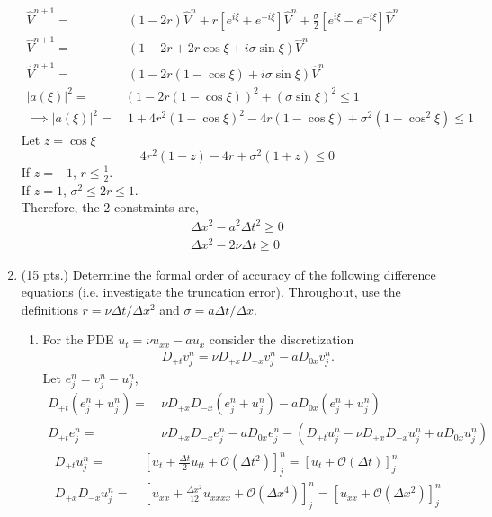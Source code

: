 \documentclass[11pt]{article}
\newcommand{\Dpt}{D_{+t}}
\newcommand{\Dpx}{D_{+x}}
\newcommand{\Dmx}{D_{-x}}
\newcommand{\Dzx}{D_{0x}}
\newcommand{\Oc}{\mathcal{O}}
\newcommand{\dx}{\Delta x}
\newcommand{\dt}{\Delta t}
\newcommand{\vnj}{v^{n}_j}
\newcommand{\texp}[3]{\left[#1\right]^{#2}_{#3}}
\newcommand{\uxx}{u_{xx}}
\newcommand{\uxxxx}{u_{xxxx}}
\newcommand{\ut}{u_t}
\newcommand{\enj}{e^{n}_{j}}
\newcommand{\unj}{u^{n}_{j}}
\newcommand{\modu}[1]{\left | {#1} \right |}
\begin{document}
\begin{enumerate}
\begin{align*}
    \hat{V}^{n+1} = & \ \left(1-2r\right)\hat{V}^n + r\left[e^{i\xi} + e^{-i\xi}\right]\hat{V}^n + \frac{\sigma}{2}\left[e^{i\xi} - e^{-i\xi}\right]\hat{V}^n \\
    \hat{V}^{n+1} = & \ \left(1 - 2r + 2r\cos\xi + i\sigma\sin\xi\right)\hat{V}^n \\
    \hat{V}^{n+1} = & \ \left(1-2r\left(1-\cos\xi\right) + i\sigma\sin\xi\right)\hat{V}^n \\
    \modu{a(\xi)}^2 = & \left(1-2r\left(1-\cos\xi\right)\right)^2 + \left(\sigma\sin\xi\right)^2 \leq 1 \\
    \implies \modu{a(\xi)}^2 = &\ 1 + 4r^2\left(1-\cos\xi\right)^2 -4r\left(1-\cos\xi\right) + \sigma^2\left(1-\cos^2\xi\right) \leq 1 
    \end{align*}
    Let $z = \cos\xi$ 
\[
4r^2\left(1-z\right) -4r + \sigma^2\left(1+z\right) \leq 0
\]
If $z=-1$, $r\leq \frac{1}{2}$. \\
If $z = 1$, $\sigma^2 \leq 2r \leq 1$.\\
Therefore, the 2 constraints are,
\begin{align}
\dx^2 - a^2\dt^2 \geq 0 \\
\dx^2 -2\nu\dt \geq 0
\end{align}
  \item (15 pts.) {\color{red}Determine the formal order of accuracy of the following difference equations (i.e. investigate the truncation error). Throughout, use the definitions }$r=\nu\dt/\dx^2$ {\color{red}and} $\sigma=a\dt/\dx$.
    \begin{enumerate}
      \item {\color{blue}For the PDE }$u_t= \nu u_{xx}-au_x$ {\color{blue}consider the discretization}
        \begin{align*}
         \Dpt v_j^n = \nu\Dpx\Dmx v_j^n-a\Dzx v_j^n.
        \end{align*}
        Let $\enj = \vnj - \unj$, 
        \begin{align*}
        \Dpt \left(\enj + \unj \right)= & \ \nu \Dpx\Dmx \left(\enj + \unj \right) -a\Dzx \left(\enj + \unj \right) \\
        \Dpt \enj = & \ \nu \Dpx\Dmx \enj -a\Dzx \enj -\left(\Dpt \unj - \nu \Dpx\Dmx \unj +a\Dzx \unj\right)
        \end{align*}
        \begin{align*}
        \Dpt \unj = & \  \texp{\ut + \frac{\dt}{2}u_{tt} + \Oc(\dt^2)}{n}{j} = \texp{\ut + \Oc(\dt)}{n}{j}\\
        \Dpx\Dmx \unj = & \ \texp{\uxx + \frac{\dx^2}{12}\uxxxx + \Oc(\dx^4)}{n}{j} = \texp{\uxx + \Oc(\dx^2)}{n}{j} \\

\end{align*}
\end{enumerate}
\end{enumerate}
\end{document}
